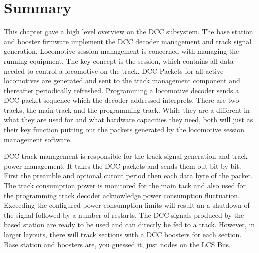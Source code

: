 \section{Summary}

This chapter gave a high level overview on the DCC subsystem. The base station and booster firmware implement the DCC decoder management and track signal generation. Locomotive session management is concerned with managing the running equipment. The key concept is the session, which contains all data needed to control a locomotive on the track. DCC Packets for all active locomotives are generated and sent to the track management component and thereafter periodically refreshed. Programming a locomotive decoder sends a DCC packet sequence which the decoder addressed interprets. There are two tracks, the main track and the programming track. While they are a different in what they are used for and what hardware capacities they need, both will just as their key function putting out the packets generated by the locomotive session management software.

DCC track management is responsible for the track signal generation and track power management. It takes the DCC packets and sends them out bit by bit. First the preamble and optional cutout period then each data byte of the packet. The track consumption power is monitored for the main tack and also used for the programming track decoder acknowledge power consumption fluctuation. Exceeding the configured power consumption limits will result an a shutdown of the signal followed by a number of restarts. The DCC signals produced by the based station are ready to be used and can directly be fed to a track. However, in larger layouts, there will track sections with a DCC boosters for each section. Base station and boosters are, you guessed it, just nodes on the LCS Bus.
